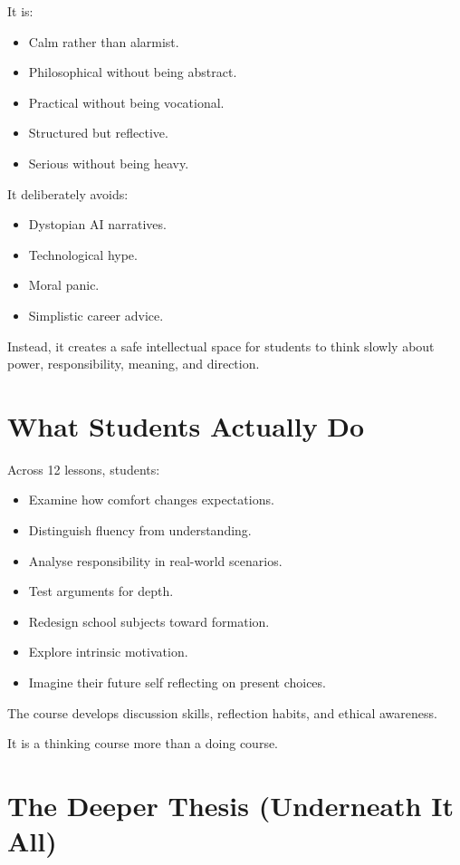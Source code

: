 \documentclass[12pt]{article}
\begin{document}
It is:
\begin{itemize}
  \item Calm rather than alarmist.
  \item Philosophical without being abstract.
  \item Practical without being vocational.
  \item Structured but reflective.
  \item Serious without being heavy.
\end{itemize}

It deliberately avoids:
\begin{itemize}
  \item Dystopian AI narratives.
  \item Technological hype.
  \item Moral panic.
  \item Simplistic career advice.
\end{itemize}

Instead, it creates a safe intellectual space for students to think slowly about power, responsibility, meaning, and direction.

\section*{What Students Actually Do}

Across 12 lessons, students:
\begin{itemize}
  \item Examine how comfort changes expectations.
  \item Distinguish fluency from understanding.
  \item Analyse responsibility in real-world scenarios.
  \item Test arguments for depth.
  \item Redesign school subjects toward formation.
  \item Explore intrinsic motivation.
  \item Imagine their future self reflecting on present choices.
\end{itemize}

The course develops discussion skills, reflection habits, and ethical awareness.

It is a thinking course more than a doing course.

\section*{The Deeper Thesis (Underneath It All)}
\end{document}
